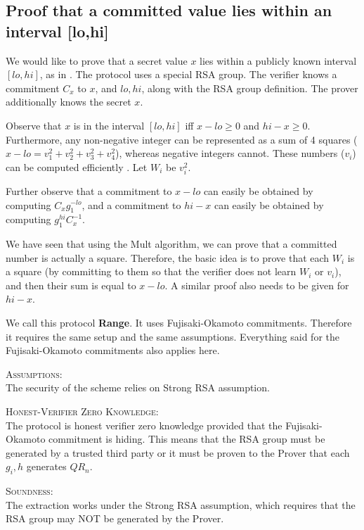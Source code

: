 \subsection{Proof that a committed value lies within an interval [lo,hi]}

We would like to prove that a secret value $x$ lies within a publicly known interval $[lo,hi]$, as in \cite{boudotInterval,lipmaaInterval}. The protocol uses a special RSA group. The verifier knows a commitment $C_x$ to $x$, and $lo,hi$, along with the RSA group definition. The prover additionally knows the secret $x$.

Observe that $x$ is in the interval $[lo,hi]$ iff $x-lo \geq 0$ and $hi-x \geq 0$. Furthermore, any non-negative integer can be represented as a sum of 4 squares \cite{lipmaaInterval} (\eg $x-lo = v_{1}^{2} + v_{2}^{2} + v_{3}^{2} + v_{4}^{2}$), whereas negative integers cannot. These numbers ($v_i$) can be computed efficiently \cite{lipmaaInterval,rabinShallit}. Let $W_i$ be $v_{i}^{2}$.

Further observe that a commitment to $x-lo$ can easily be obtained by computing $C_x g_{1}^{-lo}$, and a commitment to $hi-x$ can easily be obtained by computing $g_{1}^{hi} C_{x}^{-1}$.

We have seen that using the Mult algorithm, we can prove that a committed number is actually a square. Therefore, the basic idea is to prove that each $W_i$ is a square (by committing to them so that the verifier does not learn $W_i$ or $v_i$), and then their sum is equal to $x-lo$. A similar proof also needs to be given for $hi-x$.

We call this protocol \textbf{Range}. It uses Fujisaki-Okamoto commitments. Therefore it requires the same setup and the same assumptions. Everything said for the Fujisaki-Okamoto commitments also applies here.


\textsc{Assumptions}:\\
The security of the scheme relies on Strong RSA assumption.


\textsc{Honest-Verifier Zero Knowledge}:\\
The protocol is honest verifier zero knowledge provided that the Fujisaki-Okamoto commitment is hiding. This means that the RSA group must be generated by a trusted third party or it must be proven to the Prover that each $g_i,h$ generates $QR_n$.


\textsc{Soundness}:\\
The extraction works under the Strong RSA assumption, which requires that the RSA group may NOT be generated by the Prover.
\\



